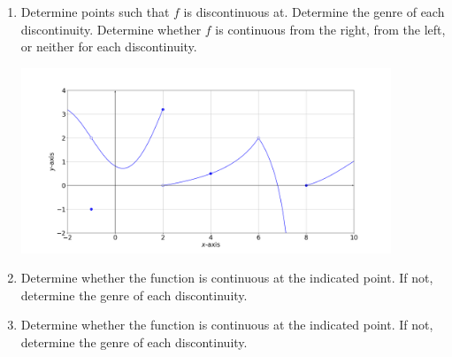 \documentclass[11pt]{book}
\begin{document}
\begin{enumerate}[label=\arabic*.]
    \item Determine points such that $f$ is discontinuous at. Determine the genre of each discontinuity. Determine whether $f$ is continuous from the right, from the left, or neither for each discontinuity.
    \begin{center}
        \includegraphics[width=0.87\textwidth]{continuity_exercise_1.png}
    \end{center}
    \item Determine whether the function is continuous at the indicated point. If not, determine the genre of each discontinuity.
    \begin{enumerate}
    \end{enumerate}
    \item Determine whether the function is continuous at the indicated point. If not, determine the genre of each discontinuity.
    \begin{enumerate}
\end{enumerate}
\end{enumerate}
\end{document}
